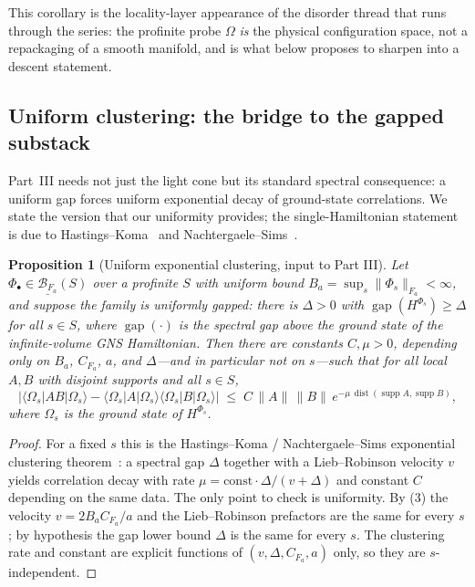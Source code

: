 \documentclass[12pt]{article}
\newcommand{\cond}[1]{\underline{#1}}          %
\newcommand{\Ffun}{F}                          %
\newcommand{\gapof}[1]{\operatorname{gap}(#1)} %
\newcommand{\gapbound}{\Delta}                  %
\newcommand{\dis}{\Omega}                       %
\newcommand{\norm}[1]{\lVert #1\rVert}
\newcommand{\Fanorm}[1]{\lVert #1\rVert_{F_a}}
\newcommand{\supp}{\operatorname{supp}}
\newcommand{\dist}{\operatorname{dist}}
\newtheorem{proposition}[theorem]{Proposition}
\theoremstyle{definition}
\theoremstyle{remark}
\begin{document}
This corollary is the locality-layer appearance of the disorder thread that runs through the
series: the profinite probe $\dis$ \emph{is} the physical configuration space, not a
repackaging of a smooth manifold, and  is what  below
proposes to sharpen into a descent statement.

\subsection{Uniform clustering: the bridge to the gapped substack}
\label{sec:uniform-clustering}

Part~III needs not just the light cone but its standard spectral consequence: a uniform gap
forces uniform exponential decay of ground-state correlations. We state the version that our
uniformity provides; the single-Hamiltonian statement is due to
Hastings--Koma~\cite{hastings-koma} and Nachtergaele--Sims~\cite{nachtergaele-sims-clustering}.

\begin{proposition}[Uniform exponential clustering, input to Part III]
\label{prop:clustering}
Let $\Phi_\bullet\in\cond{\mathcal B_{\Ffun_a}}(S)$ over a profinite $S$ with uniform bound
$B_a=\sup_s\Fanorm{\Phi_s}<\infty$, and suppose the family is uniformly gapped: there is
$\gapbound>0$ with $\gapof{H^{\Phi_s}}\ge\gapbound$ for all $s\in S$, where $\gapof{\cdot}$ is
the spectral gap above the ground state of the infinite-volume GNS Hamiltonian. Then there are
constants $C,\mu>0$, depending only on $B_a$, $C_{\Ffun_a}$, $a$, and $\gapbound$---and in
particular not on $s$---such that for all local $A,B$ with disjoint supports and all $s\in S$,
\[
  \bigl\lvert\langle\Omega_s\lvert AB\rvert\Omega_s\rangle
    -\langle\Omega_s\lvert A\rvert\Omega_s\rangle
     \langle\Omega_s\lvert B\rvert\Omega_s\rangle\bigr\rvert
  \;\le\; C\,\norm{A}\,\norm{B}\,e^{-\mu\,\dist(\supp A,\supp B)},
\]
where $\Omega_s$ is the ground state of $H^{\Phi_s}$.
\end{proposition}
\begin{proof}
For a fixed $s$ this is the Hastings--Koma / Nachtergaele--Sims exponential clustering
theorem~\cite{hastings-koma,nachtergaele-sims-clustering}: a spectral gap $\gapbound$ together
with a Lieb--Robinson velocity $v$ yields correlation decay with rate
$\mu=\mathrm{const}\cdot\gapbound/(v+\gapbound)$ and constant $C$ depending on the same data.
The only point to check is uniformity. By (3) the velocity $v=2B_a
C_{\Ffun_a}/a$ and the Lieb--Robinson prefactors are the same for every $s$; by hypothesis the
gap lower bound $\gapbound$ is the same for every $s$. The clustering rate and constant are
explicit functions of $(v,\gapbound,C_{\Ffun_a},a)$ only, so they are $s$-independent.
\end{proof}
\end{document}
